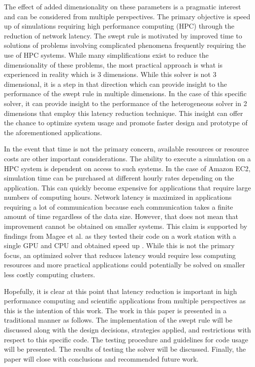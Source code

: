 \documentclass[review]{elsarticle}
\begin{document}
\par
The effect of added dimensionality on these parameters is a pragmatic interest and can be considered from multiple perspectives. The primary objective is speed up of simulations requiring high performance computing (HPC) through the reduction of network latency. The swept rule is motivated by improved time to solutions of problems involving complicated phenomena frequently requiring the use of HPC systems. While many simplifications exist to reduce the dimensionality of these problems, the most practical approach is what is experienced in reality which is 3 dimensions. While this solver is not 3 dimensional, it is a step in that direction which can provide insight to the performance of the swept rule in multiple dimensions. In the case of this specific solver, it can provide insight to the performance of the heterogeneous solver in 2 dimensions that employ this latency reduction technique. This insight can offer the chance to optimize system usage and promote faster design and prototype of the aforementioned applications.

\par
In the event that time is not the primary concern, available resources or resource costs are other important considerations. The ability to execute a simulation on a HPC system is dependent on access to such systems. In the case of Amazon EC2, simulation time can be purchased at different hourly rates depending on the application. This can quickly become expensive for applications that require large numbers of computing hours. Network latency is maximized in applications requiring a lot of communication because each communication takes a finite amount of time regardless of the data size. However, that does not mean that improvement cannot be obtained on smaller systems. This claim is supported by findings from Magee et al. as they tested their code on a work station with a single GPU and CPU and obtained speed up \cite{Magee2018}. While this is not the primary focus, an optimized solver that reduces latency would require less computing resources and more practical applications could potentially be solved on smaller less costly computing clusters.

\par
Hopefully, it is clear at this point that latency reduction is important in high performance computing and scientific applications from multiple perspectives as this is the intention of this work. The work in this paper is presented in a traditional manner as follows. The implementation of the swept rule will be discussed along with the design decisions, strategies applied, and restrictions with respect to this specific code. The testing procedure and guidelines for code usage will be presented. The results of testing the solver will be discussed. Finally, the paper will close with conclusions and recommended future work.
\end{document}
